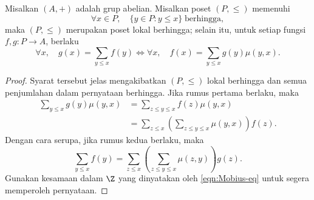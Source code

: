 \begin{proposition}\label{prop:Mobius-inversion}
	Misalkan $(A,+)$ adalah grup abelian. Misalkan poset $(P,\leq)$ memenuhi
	\[ \forall x \in P, \quad \{y \in P: y \leq x \} \;\text{berhingga}, \]
	maka $(P,\leq)$ merupakan poset lokal berhingga; selain itu, untuk setiap fungsi $f,g: P \to A$, berlaku
	\[ \forall x,\quad g(x) = \sum_{y \leq x} f(y) \iff \forall x,\quad f(x) = \sum_{y \leq x} g(y) \mu(y,x). \]
\end{proposition}
\begin{proof}
	Syarat tersebut jelas mengakibatkan $(P,\leq)$ lokal berhingga dan semua penjumlahan dalam pernyataan berhingga. Jika rumus pertama berlaku, maka
	\begin{align*}
		\sum_{y \leq x} g(y) \mu(y,x) & = \sum_{z \leq y \leq x} f(z) \mu(y,x) \\
		& = \sum_{z \leq x} \left( \sum_{z \leq y \leq x} \mu(y,x) \right) f(z).
	\end{align*}
	Dengan cara serupa, jika rumus kedua berlaku, maka
	\[ \sum_{y \leq x} f(y) = \sum_{z \leq x} \left( \sum_{z \leq y \leq x} \mu(z,y)\right) g(z). \]
	Gunakan kesamaan dalam $\Z$ yang dinyatakan oleh \eqref{eqn:Mobius-eq} untuk segera memperoleh pernyataan.
\end{proof}

